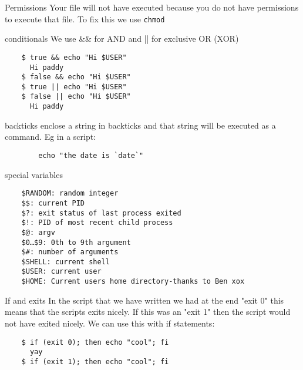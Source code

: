 \documentclass{beamer}
\begin{document}
\begin{frame}{Permissions}
    Your file will not have executed because you do not have permissions to execute that file. To fix this we use \texttt{chmod}\\
\end{frame}

\begin{frame}[fragile]{conditionals}
    We use \&\& for AND
    and || for exclusive OR (XOR)
    \begin{verbatim}
    $ true && echo "Hi $USER"
      Hi paddy
    $ false && echo "Hi $USER"
    $ true || echo "Hi $USER"
    $ false || echo "Hi $USER"
      Hi paddy
    \end{verbatim}    

\end{frame}

\begin{frame}[fragile]{backticks}
    enclose a string in backticks and that string will be executed as a command. Eg in a script:
    \begin{verbatim}
        echo "the date is `date`"
    \end{verbatim}
\end{frame}

\begin{frame}[fragile]{special variables}
    \begin{verbatim}
    $RANDOM: random integer
    $$: current PID
    $?: exit status of last process exited
    $!: PID of most recent child process
    $@: argv
    $0…$9: 0th to 9th argument
    $#: number of arguments
    $SHELL: current shell
    $USER: current user
    $HOME: Current users home directory-thanks to Ben xox

    \end{verbatim}
\end{frame}

\begin{frame}[fragile]{If and exits}
    In the script that we have written we had at the end "exit 0" this means that the scripts exits nicely. If this was an "exit 1" then the script would not have exited nicely. We can use this with if statements:\\
    \begin{verbatim}
    $ if (exit 0); then echo "cool"; fi
      yay
    $ if (exit 1); then echo "cool"; fi
    \end{verbatim}
\end{frame}
\end{document}
